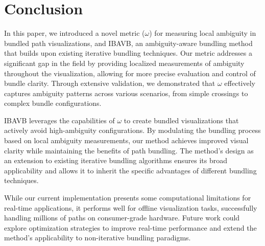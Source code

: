 
\section{Conclusion}\label{sec:conclusion}

In this paper, we introduced a novel metric ($\omega$) for measuring local ambiguity in bundled path visualizations, and IBAVB, an ambiguity-aware bundling method that builds upon existing iterative bundling techniques. Our metric addresses a significant gap in the field by providing localized measurements of ambiguity throughout the visualization, allowing for more precise evaluation and control of bundle clarity. Through extensive validation, we demonstrated that $\omega$ effectively captures ambiguity patterns across various scenarios, from simple crossings to complex bundle configurations.

IBAVB leverages the capabilities of $\omega$ to create bundled visualizations that actively avoid high-ambiguity configurations. By modulating the bundling process based on local ambiguity measurements, our method achieves improved visual clarity while maintaining the benefits of path bundling. The method's design as an extension to existing iterative bundling algorithms ensures its broad applicability and allows it to inherit the specific advantages of different bundling techniques.

While our current implementation presents some computational limitations for real-time applications, it performs well for offline visualization tasks, successfully handling millions of paths on consumer-grade hardware. Future work could explore optimization strategies to improve real-time performance and extend the method's applicability to non-iterative bundling paradigms.
